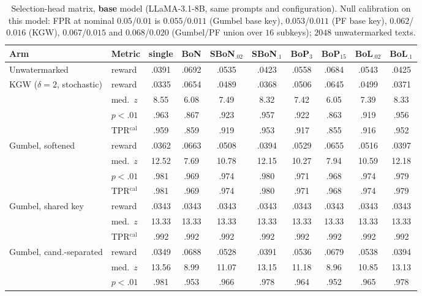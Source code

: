 \documentclass{article} %
\begin{document}
\begin{table}[h]
\caption{Selection-head matrix, \textbf{base} model (LLaMA-3.1-8B, same
prompts and configuration). Null calibration on this model: FPR at nominal
$0.05$/$0.01$ is $0.055$/$0.011$ (Gumbel base key), $0.053$/$0.011$ (PF base
key), $0.062$/$0.016$ (KGW), $0.067$/$0.015$ and $0.068$/$0.020$ (Gumbel/PF
union over $16$ subkeys); $2048$ unwatermarked texts.}
\label{tab:matrix_base}
\begin{center}
\scriptsize
\setlength{\tabcolsep}{3.2pt}
\begin{tabular}{llcccccccc}
\toprule
Arm & Metric & single & BoN & SBoN$_{.02}$ & SBoN$_{.1}$ & BoP$_{3}$ & BoP$_{15}$ & BoL$_{.02}$ & BoL$_{.1}$ \\
\midrule
Unwatermarked & reward & .0391 & .0692 & .0535 & .0423 & .0558 & .0684 & .0543 & .0425 \\
\midrule
KGW ($\delta{=}2$, stochastic) & reward & .0335 & .0654 & .0489 & .0368 & .0506 & .0645 & .0499 & .0371 \\
 & med.\ $z$ & 8.55 & 6.08 & 7.49 & 8.32 & 7.42 & 6.05 & 7.39 & 8.33 \\
 & $p{<}.01$ & .963 & .867 & .923 & .957 & .922 & .863 & .919 & .956 \\
 & TPR$^{\mathrm{cal}}$ & .959 & .859 & .919 & .953 & .917 & .855 & .916 & .952 \\
\midrule
Gumbel, softened & reward & .0362 & .0663 & .0508 & .0394 & .0529 & .0655 & .0516 & .0397 \\
 & med.\ $z$ & 12.52 & 7.69 & 10.78 & 12.15 & 10.27 & 7.94 & 10.59 & 12.18 \\
 & $p{<}.01$ & .981 & .969 & .974 & .980 & .971 & .968 & .974 & .979 \\
 & TPR$^{\mathrm{cal}}$ & .981 & .969 & .974 & .980 & .971 & .968 & .974 & .979 \\
\midrule
Gumbel, shared key & reward & .0343 & .0343 & .0343 & .0343 & .0343 & .0343 & .0343 & .0343 \\
 & med.\ $z$ & 13.33 & 13.33 & 13.33 & 13.33 & 13.33 & 13.33 & 13.33 & 13.33 \\
 & TPR$^{\mathrm{cal}}$ & .992 & .992 & .992 & .992 & .992 & .992 & .992 & .992 \\
\midrule
Gumbel, cand.-separated & reward & .0349 & .0688 & .0528 & .0391 & .0536 & .0679 & .0538 & .0394 \\
 & med.\ $z$ & 13.56 & 8.99 & 11.07 & 13.15 & 11.18 & 8.96 & 10.85 & 13.13 \\
 & $p{<}.01$ & .981 & .953 & .966 & .978 & .964 & .952 & .965 & .978 \\

\end{tabular}
\end{center}
\end{table}
\end{document}
